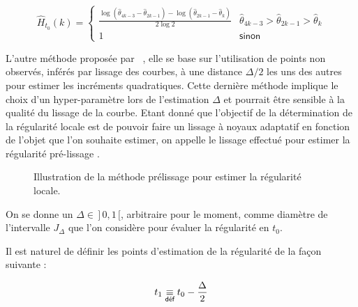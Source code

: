 $$\hat H_{t_0}(k) = \begin{cases} \displaystyle\frac{\log\left( \hat \theta_{4k-3} - \hat \theta_{2k-1}  \right) - \log \left(  \hat\theta_{2k-1} - \hat \theta_k \right)}{2\log 2} & \hat \theta_{4k-3} > \hat \theta_{2k-1} > \hat \theta_{k}
    \\
    1 & \textsf{sinon}
\end{cases}$$


L'autre méthode proposée par ~\cite{golovkine2021adaptive,maissoro-SmoothnessFTSweakDep}, elle se base sur l'utilisation de points non observés, inférés par lissage des courbes, à une distance $\Delta / 2$ les uns des autres pour estimer les incréments quadratiques. Cette dernière méthode implique le choix d'un hyper-paramètre lors de l'estimation $\Delta$ et pourrait être sensible à la qualité du lissage de la courbe. Etant donné que l'objectif de la détermination de la régularité locale est de pouvoir faire un lissage à noyaux adaptatif en fonction de l'objet que l'on souhaite estimer, on appelle le lissage effectué pour estimer la régularité \og pré-lissage \fg.

\begin{figure}[H]
    \centering
    \begin{minipage}{0.45\linewidth}
        
    \end{minipage}
    \hfill
    \begin{minipage}{0.45\linewidth}
        
    \end{minipage}
    \caption{Illustration de la méthode \og prélissage \fg pour estimer la régularité locale.}
    \label{fig:delta_method_example}
\end{figure}
\smallskip

On se donne un $\Delta \in \, ] \, 0,1 \,[$, arbitraire pour le moment, comme diamètre de l'intervalle $J_\Delta$ que l'on considère pour évaluer la régularité en $t_0$.

Il est naturel de définir les points d'estimation de la régularité de la façon suivante :

$$t_1 \isdef t_0 - \frac \Delta 2$$

